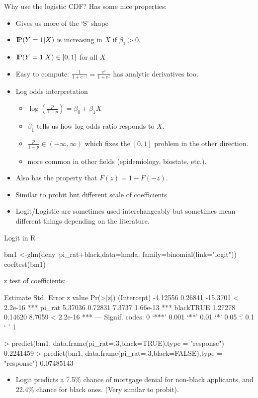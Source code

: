 \begin{frame}{Why use the logistic CDF?}
Has some nice properties:
\begin{itemize}
\item Gives us more of the `S' shape
\item $\text{I\kern-0.15em P}(Y=1|X)$ is increasing in $X$ if $\beta_1>0$.
\item $\text{I\kern-0.15em P}(Y=1|X) \in [0,1]$ for all $X$
\item Easy to compute: $\frac{1}{1+e^{-z}}=\frac{e^{z}}{1+e^{z}}$ has analytic derivatives too.
\item Log odds interpretation
\begin{itemize}
\item $\log(\frac{p}{1-p}) = \beta_0 + \beta_1 X$
\item $\beta_1$ tells us how \alert{log odds ratio} responds to $X$.
\item $\frac{p}{1-p} \in (-\infty,\infty)$ which fixes the $[0,1]$ problem in the other direction.
\item more common in other fields (epidemiology, biostats, etc.).
\end{itemize}
\item Also has the property that $F(z) = 1-F(-z)$.
\item Similar to probit but different scale of coefficients
\item Logit/Logistic are sometimes used interchangeably but sometimes mean different things depending on the literature.
\end{itemize}
\end{frame}

\begin{frame}[fragile]{Logit in R}
\footnotesize
\begin{semiverbatim}
bm1 <-glm(deny~pi_rat+black,data=hmda, family=binomial(link="logit"))
coeftest(bm1)

z test of coefficients:

            Estimate Std. Error  z value  Pr(>|z|)    
(Intercept) -4.12556    0.26841 -15.3701 < 2.2e-16 ***
pi_rat       5.37036    0.72831   7.3737  1.66e-13 ***
blackTRUE    1.27278    0.14620   8.7059 < 2.2e-16 ***
---
    Signif. codes:  0 `***' 0.001 `**' 0.01 `*' 0.05 `.' 0.1 ` ' 1

> predict(bm1, data.frame(pi_rat=.3,black=TRUE),type = "response")
0.2241459 
> predict(bm1, data.frame(pi_rat=.3,black=FALSE),type = "response")
0.07485143  
\end{semiverbatim}
\begin{itemize}
\item Logit predicts a 7.5\% chance of mortgage denial for non-black applicants, and 22.4\% chance for black ones. (Very similar to probit).
\end{itemize}
\end{frame}




